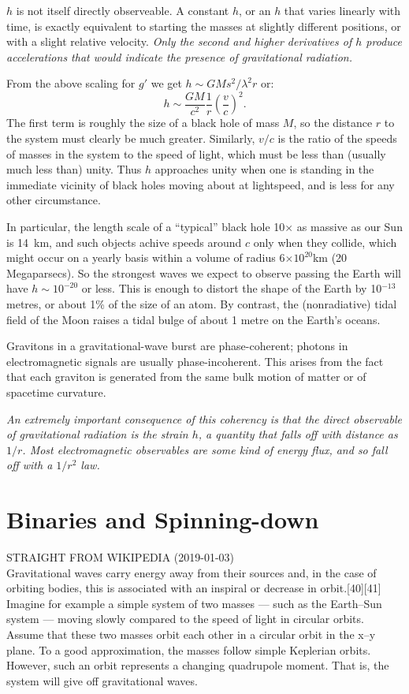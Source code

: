 \documentclass[11pt,a4paper]{article}
\begin{document}
$h$ is not itself directly observeable. A constant $h$, or an $h$ that
varies linearly with time, is exactly equivalent to starting the
masses at slightly different positions, or with a slight relative
velocity. {\it Only the second and higher derivatives of $h$ produce
accelerations that would indicate the presence of gravitational
radiation.}

From the above scaling for $g'$ we get $h \sim GMs^2/ \lambda^{2} r$
or:
\begin{equation}
h \sim \frac{GM}{c^2}\frac{1}{r}(\frac{v}{c})^2 .
\end{equation}
The first term is roughly the size of a black hole of mass $M$, so the
distance $r$ to the system must clearly be much greater. Similarly, $v/c$ 
is the ratio of the speeds of masses in the system to the speed of
light, which must be less than (usually much less than) unity. Thus $h$ 
approaches unity when one is standing in the immediate vicinity of
black holes moving about at lightspeed, and is less for any other
circumstance.

In particular, the length scale of a ``typical'' black hole 10$\times$
as massive as our Sun is 14~km, and such objects achive speeds around $c$ 
only when they collide, which might occur on a yearly basis within a
volume of radius 6$\times10^{20}$km (20 Megaparsecs). So the strongest
waves we expect to observe passing the Earth will have $h\sim
10^{-20}$ or less. This is enough to distort the shape of the Earth by
10$^{-13}$ metres, or about 1\% of the size of an atom. By contrast,
the (nonradiative) tidal field of the Moon raises a tidal bulge of
about 1 metre on the Earth's oceans.
 

Gravitons in a gravitational-wave burst are phase-coherent; photons in electromagnetic signals are usually phase-incoherent. This arises from the fact that each graviton is generated from the same bulk motion of matter or of spacetime curvature. 

{\it An extremely important consequence of this coherency is that the direct observable of gravitational radiation is the strain $h$, a quantity that falls off with distance as $1/r$. Most electromagnetic observables are some kind of energy flux, and so fall off with a $1/r^{2}$ law.}


\section{Binaries and Spinning-down}
STRAIGHT FROM WIKIPEDIA (2019-01-03)\\
Gravitational waves carry energy away from their sources and, in the
case of orbiting bodies, this is associated with an inspiral or
decrease in orbit.[40][41] Imagine for example a simple system of two
masses — such as the Earth–Sun system — moving slowly compared to the
speed of light in circular orbits. Assume that these two masses orbit
each other in a circular orbit in the x–y plane. To a good
approximation, the masses follow simple Keplerian orbits. However,
such an orbit represents a changing quadrupole moment. That is, the
system will give off gravitational waves.
\end{document}
